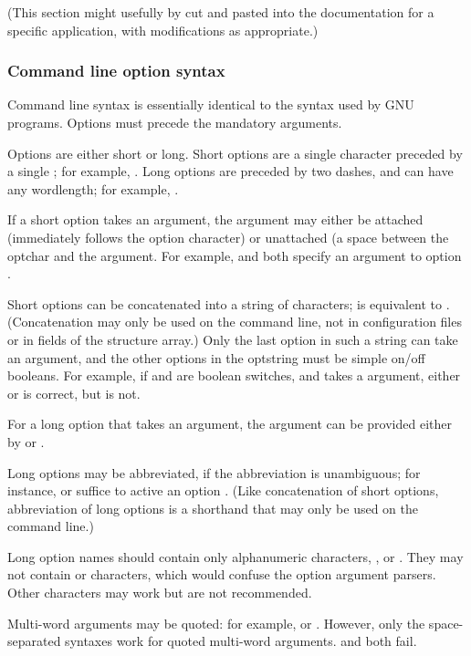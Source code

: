 (This section might usefully by cut and pasted into the documentation
for a specific application, with modifications as appropriate.)

   \subsubsection{Command line option syntax}

Command line syntax is essentially identical to the syntax used by GNU
programs. Options must precede the mandatory arguments.

Options are either short or long. Short options are a single character
preceded by a single \ccode{-}; for example, . Long options
are preceded by two dashes, and can have any wordlength; for example,
.

If a short option takes an argument, the argument may either be
attached (immediately follows the option character) or unattached (a
space between the optchar and the argument. For example, 
and  both specify an argument  to option
.

Short options can be concatenated into a string of characters;
 is equivalent to . (Concatenation may
only be used on the command line, not in configuration files or in
fields of the  structure array.) Only the last
option in such a string can take an argument, and the other options in
the optstring must be simple on/off booleans. For example, if
 and  are boolean switches, and  takes a
 argument, either  or 
is correct, but  is not.

For a long option that takes an argument, the argument can be provided
either by  or .

Long options may be abbreviated, if the abbreviation is unambiguous;
for instance,  or  suffice to active an
option . (Like concatenation of short options,
abbreviation of long options is a shorthand that may only be used on
the command line.)

Long option names should contain only alphanumeric characters,
\ccode{-}, or \ccode{\_}. They may not contain \ccode{=} or \ccode{,}
characters, which would confuse the option argument parsers. Other
characters may work but are not recommended.

Multi-word arguments may be quoted: for example,  or . However, only the space-separated
syntaxes work for quoted multi-word arguments.  and  both fail.

